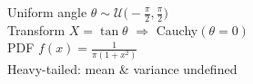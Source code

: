\documentclass[preview]{standalone}
\begin{document}
Uniform angle $\theta\sim\mathcal{U}\!\bigl(-\tfrac{\pi}{2},\tfrac{\pi}{2}\bigr)$\\Transform $X=\tan\theta$ $\Rightarrow$ Cauchy$(\theta=0)$\\PDF $\displaystyle f(x)=\frac{1}{\pi(1+x^2)}$\\Heavy-tailed: mean \& variance undefined\\
\end{document}

